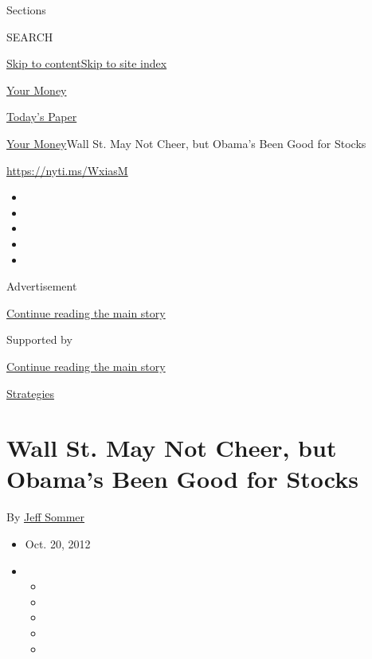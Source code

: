 Sections

SEARCH

\protect\hyperlink{site-content}{Skip to
content}\protect\hyperlink{site-index}{Skip to site index}

\href{https://www.nytimes3xbfgragh.onion/section/your-money}{Your Money}

\href{https://myaccount.nytimes3xbfgragh.onion/auth/login?response_type=cookie\&client_id=vi}{}

\href{https://www.nytimes3xbfgragh.onion/section/todayspaper}{Today's
Paper}

\href{/section/your-money}{Your Money}\textbar{}Wall St. May Not Cheer,
but Obama's Been Good for Stocks

\url{https://nyti.ms/WxiasM}

\begin{itemize}
\item
\item
\item
\item
\item
\end{itemize}

Advertisement

\protect\hyperlink{after-top}{Continue reading the main story}

Supported by

\protect\hyperlink{after-sponsor}{Continue reading the main story}

\href{/column/business-strategies}{Strategies}

\hypertarget{wall-st-may-not-cheer-but-obamas-been-good-for-stocks}{%
\section{Wall St. May Not Cheer, but Obama's Been Good for
Stocks}\label{wall-st-may-not-cheer-but-obamas-been-good-for-stocks}}

By \href{https://www.nytimes3xbfgragh.onion/by/jeff-sommer}{Jeff Sommer}

\begin{itemize}
\item
  Oct. 20, 2012
\item
  \begin{itemize}
  \item
  \item
  \item
  \item
  \item
  \end{itemize}
\end{itemize}

